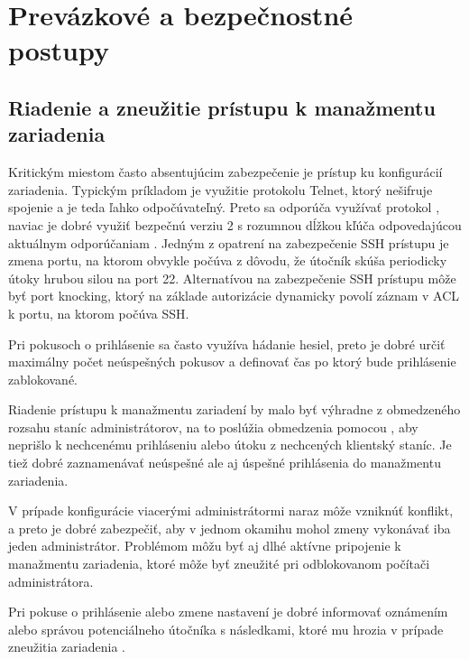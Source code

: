 \section{Prevázkové a bezpečnostné postupy}

\subsection*{Riadenie a zneužitie prístupu k manažmentu zariadenia}
Kritickým miestom často absentujúcim zabezpečenie je prístup ku konfigurácií zariadenia. Typickým príkladom je využitie protokolu Telnet, ktorý nešifruje spojenie a je teda ľahko odpočúvateľný. Preto sa odporúča využívať protokol , naviac je dobré využiť bezpečnú verziu 2 s rozumnou dĺžkou kľúča odpovedajúcou aktuálnym odporúčaniam \cite{CIS_DrTLsgXv24lxeIIM} \cite{Barker2019}. Jedným z opatrení na zabezpečenie SSH prístupu je zmena portu, na ktorom obvykle počúva z dôvodu, že útočník skúša periodicky útoky hrubou silou na  port 22. Alternatívou na zabezpečenie SSH prístupu môže byť port knocking, ktorý na základe autorizácie dynamicky povolí záznam v ACL k portu, na ktorom počúva SSH.

Pri pokusoch o prihlásenie sa často využíva hádanie hesiel, preto je dobré určiť maximálny počet neúspešných pokusov a definovať čas po ktorý bude prihlásenie zablokované.

Riadenie prístupu k manažmentu zariadení by malo byť výhradne z obmedzeného rozsahu staníc administrátorov, na to poslúžia obmedzenia pomocou , aby neprišlo k nechcenému prihláseniu alebo útoku  z nechcených klientský staníc. Je tiež dobré zaznamenávať neúspešné ale aj úspešné prihlásenia do manažmentu zariadenia. 

V prípade konfigurácie viacerými administrátormi naraz môže vzniknúť konflikt, a preto je dobré zabezpečiť, aby v jednom okamihu mohol zmeny vykonávať iba jeden administrátor. Problémom môžu byť aj dlhé aktívne pripojenie k manažmentu zariadenia, ktoré môže byť zneužité pri odblokovanom počítači administrátora. 

Pri pokuse o prihlásenie alebo zmene nastavení je dobré informovať oznámením alebo správou potenciálneho útočníka s následkami, ktoré mu hrozia v prípade zneužitia zariadenia \cite{CIS_DrTLsgXv24lxeIIM}. 

